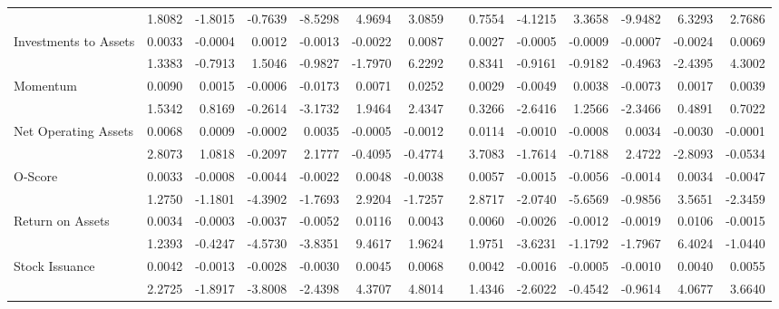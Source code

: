 \begin{sidewaystable}[htbp]
{\begin{tabular}{lrrrrrrrrrrrrr}
& 1.8082 & -1.8015 & -0.7639 & -8.5298 & 4.9694 & 3.0859 &       & 0.7554 & -4.1215 & 3.3658 & -9.9482 & 6.3293 & 2.7686 \\
Investments to Assets & 0.0033 & -0.0004 & 0.0012 & -0.0013 & -0.0022 & 0.0087 &       & 0.0027 & -0.0005 & -0.0009 & -0.0007 & -0.0024 & 0.0069 \\
& 1.3383 & -0.7913 & 1.5046 & -0.9827 & -1.7970 & 6.2292 &       & 0.8341 & -0.9161 & -0.9182 & -0.4963 & -2.4395 & 4.3002 \\
Momentum & 0.0090 & 0.0015 & -0.0006 & -0.0173 & 0.0071 & 0.0252 &       & 0.0029 & -0.0049 & 0.0038 & -0.0073 & 0.0017 & 0.0039 \\
& 1.5342 & 0.8169 & -0.2614 & -3.1732 & 1.9464 & 2.4347 &       & 0.3266 & -2.6416 & 1.2566 & -2.3466 & 0.4891 & 0.7022 \\
Net Operating Assets & 0.0068 & 0.0009 & -0.0002 & 0.0035 & -0.0005 & -0.0012 &       & 0.0114 & -0.0010 & -0.0008 & 0.0034 & -0.0030 & -0.0001 \\
& 2.8073 & 1.0818 & -0.2097 & 2.1777 & -0.4095 & -0.4774 &       & 3.7083 & -1.7614 & -0.7188 & 2.4722 & -2.8093 & -0.0534 \\
O-Score & 0.0033 & -0.0008 & -0.0044 & -0.0022 & 0.0048 & -0.0038 &       & 0.0057 & -0.0015 & -0.0056 & -0.0014 & 0.0034 & -0.0047 \\
& 1.2750 & -1.1801 & -4.3902 & -1.7693 & 2.9204 & -1.7257 &       & 2.8717 & -2.0740 & -5.6569 & -0.9856 & 3.5651 & -2.3459 \\
Return on Assets & 0.0034 & -0.0003 & -0.0037 & -0.0052 & 0.0116 & 0.0043 &       & 0.0060 & -0.0026 & -0.0012 & -0.0019 & 0.0106 & -0.0015 \\
& 1.2393 & -0.4247 & -4.5730 & -3.8351 & 9.4617 & 1.9624 &       & 1.9751 & -3.6231 & -1.1792 & -1.7967 & 6.4024 & -1.0440 \\
Stock Issuance & 0.0042 & -0.0013 & -0.0028 & -0.0030 & 0.0045 & 0.0068 &       & 0.0042 & -0.0016 & -0.0005 & -0.0010 & 0.0040 & 0.0055 \\
& 2.2725 & -1.8917 & -3.8008 & -2.4398 & 4.3707 & 4.8014 &       & 1.4346 & -2.6022 & -0.4542 & -0.9614 & 4.0677 & 3.6640 \\
\bottomrule
\end{tabular}%
}
\label{tab:liq-ff5}%
\end{sidewaystable}%

